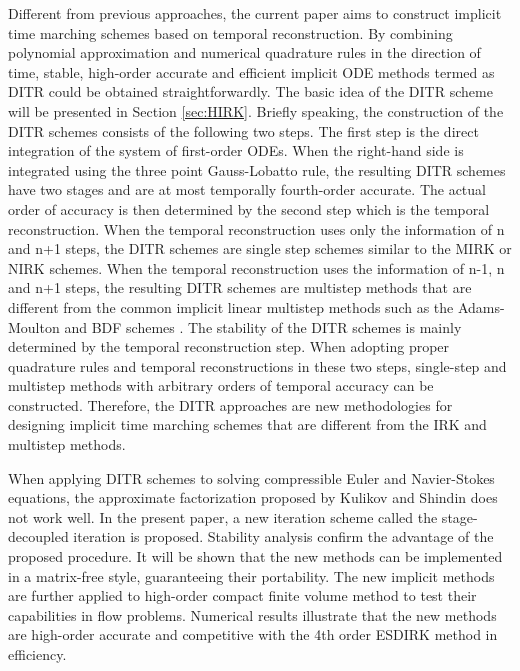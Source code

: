 Different from previous approaches,
the current paper aims to construct implicit
time marching schemes based on temporal
reconstruction.
By combining polynomial approximation and
numerical quadrature rules in the direction of time,
stable,
high-order accurate and efficient implicit ODE methods
termed as DITR could be
obtained straightforwardly.
The basic idea of the DITR scheme will be presented
in Section \ref{sec:HIRK}.
Briefly speaking, the construction of the DITR
schemes consists of the following two steps.
The first step is the direct integration of the
system of first-order ODEs.
When the right-hand side is integrated using the
three point Gauss-Lobatto rule, the resulting DITR
schemes have two stages and are at most temporally fourth-order accurate.
The actual order of accuracy is then determined by
the second step which is the temporal reconstruction.
When the temporal reconstruction uses only the information of n
and n+1 steps, the DITR schemes are single step schemes
similar to the MIRK or NIRK schemes.
When the temporal reconstruction uses the information of n-1, n and n+1 steps,
the resulting DITR schemes are multistep methods that are
different from the common implicit linear multistep
methods such as
the Adams-Moulton and BDF schemes \cite{wanner1996solving}.
The stability of the DITR
schemes is mainly determined by the temporal
reconstruction step.
When adopting proper quadrature rules
and temporal reconstructions in these two steps, single-step
and multistep methods with arbitrary orders of temporal
accuracy can be constructed. Therefore, the DITR approaches
are new methodologies for designing implicit time marching
schemes that are different from the IRK and multistep
methods.

When applying DITR schemes to solving compressible Euler and
Navier-Stokes equations, the approximate factorization
proposed by Kulikov and Shindin \cite{kulikov2007asymptotic}
does not work well.
In the present paper,
a new iteration scheme called the stage-decoupled iteration
is proposed.
Stability analysis
confirm the advantage of the proposed procedure.
It will be shown that the new methods can be implemented
in a matrix-free style, guaranteeing their portability.
The new implicit methods are further applied to
high-order compact finite volume method to
test their capabilities in flow problems. Numerical results
illustrate that the new methods are high-order accurate
and competitive with the 4th order ESDIRK method in efficiency.

